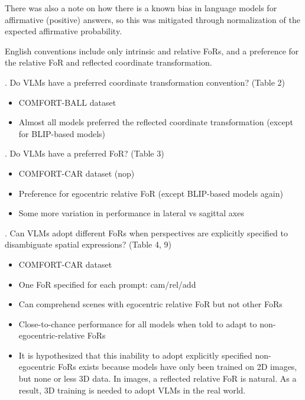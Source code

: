 \documentclass[12pt, letterpaper]{article}
\begin{document}
\begin{spacing}{1.10}
There was also a note on how there is a known bias in language models for affirmative (positive) answers, so this was mitigated through normalization of the expected affirmative probability.

English conventions include only intrinsic and relative FoRs, and a preference for the relative FoR and reflected coordinate transformation.

. Do VLMs have a preferred coordinate transformation convention? (Table 2)
\begin{itemize}
    \item COMFORT-BALL dataset
    \item Almost all models preferred the reflected coordinate transformation (except for BLIP-based models)
\end{itemize}

. Do VLMs have a preferred FoR? (Table 3)
\begin{itemize}
    \item COMFORT-CAR dataset (nop)
    \item Preference for egocentric relative FoR (except BLIP-based models again)
    \item Some more variation in performance in lateral vs sagittal axes
\end{itemize}

. Can VLMs adopt different FoRs when perspectives are explicitly specified to disambiguate spatial expressions? (Table 4, 9)
\begin{itemize}
    \item COMFORT-CAR dataset
    \item One FoR specified for each prompt: cam/rel/add
    \item Can comprehend scenes with egocentric relative FoR but not other FoRs 
    \item Close-to-chance performance for all models when told to adapt to non-egocentric-relative FoRs
    \item It is hypothesized that this inability to adopt explicitly specified non-egocentric FoRs exists because models have only been trained on 2D images, but none or less 3D data. In images, a reflected relative FoR is natural. As a result, 3D training is needed to adopt VLMs in the real world.
\end{itemize}


\end{spacing}
\end{document}
